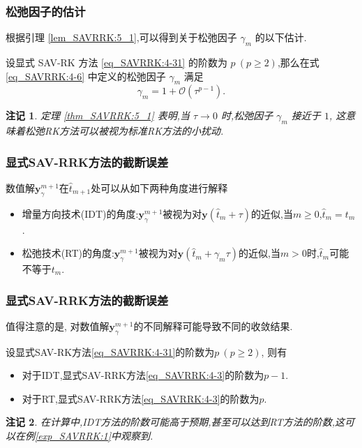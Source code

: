 \documentclass[aspectratio=169]{beamer}
\newtheorem{remark}{注记}[section] %
\numberwithin{theorem}{section} %
\numberwithin{equation}{section}%
\numberwithin{figure}{section}%
\numberwithin{table}{section}%
\begin{document}
\begin{frame}\frametitle{松弛因子的估计}

	\noindent 根据引理 \ref{lem_SAVRRK:5_1},可以得到关于松弛因子 $\gamma_m$ 的以下估计.

	\begin{theorem}\label{thm_SAVRRK:5_1}
	设显式 SAV-RK 方法 \eqref{eq_SAVRRK:4-31} 的阶数为 $p~(p \geq 2)$,那么在式 \eqref{eq_SAVRRK:4-6} 中定义的松弛因子 $\gamma_m$ 满足
	\begin{equation}\label{eq_SAVRRK:5_3}
	\gamma_m=1+\mathcal{O}(\tau^{p-1}).
	\end{equation}
	\end{theorem}	
	\begin{remark}\label{rk_SAVRRK:5_1}
		定理 \ref{thm_SAVRRK:5_1} 表明,当 $\tau\rightarrow 0$ 时,松弛因子 $\gamma_m$ 接近于 $1$,
		这意味着松弛RK方法可以被视为标准RK方法的小扰动.
		\end{remark}
\end{frame}
\begin{frame}\frametitle{显式SAV-RRK方法的截断误差}
	\noindent 数值解$\bm{y}_\gamma^{m+1}$在$\hat{t}_{m+1}$处可以从如下两种角度进行解释\cite{ketchesonRelaxationRungeKutta2019}%
	\begin{itemize}
	\item 增量方向技术(IDT)的角度:\quad$\bm{y}_\gamma^{m+1}$被视为对$\bm{y}\left(\hat{t}_m+\tau\right)$的近似,当$m \geq 0$,$\hat{t}_m=t_m$.
	\item 松弛技术(RT)的角度:\quad$\bm{y}_\gamma^{m+1}$被视为对$\bm{y}\left(\hat{t}_m+\gamma_m \tau\right)$的近似,当$m>0$时,$\hat{t}_m$可能不等于$t_m$.
	\end{itemize}
	
\end{frame}

\begin{frame}\frametitle{显式SAV-RRK方法的截断误差}
	\noindent 值得注意的是, 对数值解$\bm{y}_\gamma^{m+1}$的不同解释可能导致不同的收敛结果.
	\begin{theorem}\label{thm_SAVRRK:5_4}
	设显式SAV-RK方法\eqref{eq_SAVRRK:4-31}的阶数为$p~(p \geq 2)$, 则有
	\begin{itemize}
	\item 对于IDT,显式SAV-RRK方法\eqref{eq_SAVRRK:4-3}的阶数为$p-1$.
	\item 对于RT,显式SAV-RRK方法\eqref{eq_SAVRRK:4-3}的阶数为$p$.
	\end{itemize}
	\end{theorem}
	\begin{remark}\label{rk_SAVRRK:5_5}
		在计算中,IDT方法的阶数可能高于预期,甚至可以达到RT方法的阶数,这可以在例\ref{exp_SAVRRK:1}中观察到.
		\end{remark}
\end{frame}
\end{document}
